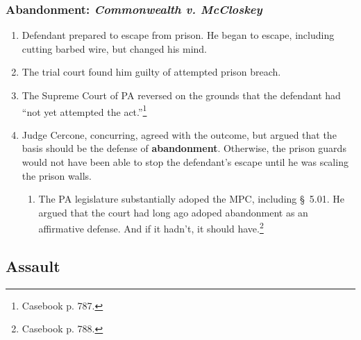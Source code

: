 % 
% 
% 
% 
% 
\subsubsection{Abandonment: \emph{Commonwealth v. McCloskey}}

\begin{enumerate}
    \item Defendant prepared to escape from prison. He began to escape, 
    including cutting barbed wire, but changed his mind.
    \item The trial court found him guilty of attempted prison breach.
    \item The Supreme Court of PA reversed on the grounds that the defendant 
    had ``not yet attempted the act.''\footnote{Casebook p. 787.}
    \item Judge Cercone, concurring, agreed with the outcome, but argued that 
    the basis should be the defense of \textbf{abandonment}. Otherwise, the 
    prison guards would not have been able to stop the defendant's escape 
    until he was scaling the prison walls.
    \begin{enumerate}
        \item The PA legislature substantially adoped the MPC, including \S\ 
        5.01. He argued that the court had long ago adoped abandonment as an 
        affirmative defense. And if it hadn't, it should 
        have.\footnote{Casebook p. 788.}
    \end{enumerate}
\end{enumerate}

\subsection{Assault}

